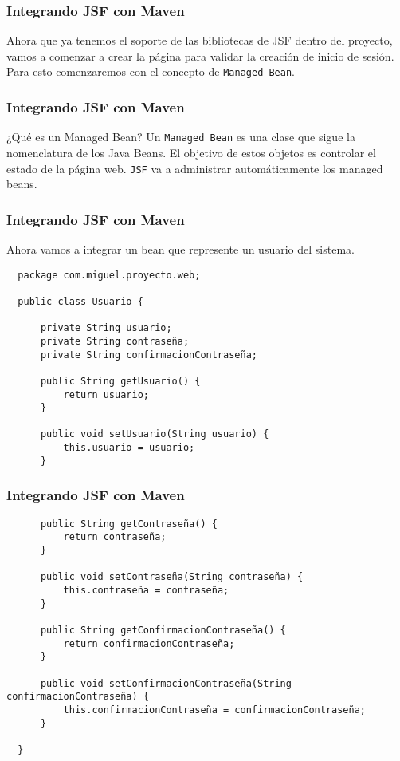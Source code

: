 \documentclass{beamer}
\begin{document}
\begin{frame}[fragile]
  \frametitle{Integrando JSF con Maven}
  Ahora que ya tenemos el soporte de las bibliotecas de JSF dentro del
  proyecto, vamos a comenzar a crear la página para validar la
  creación de inicio de sesión. Para esto comenzaremos con el concepto
  de \texttt{Managed Bean}.
\end{frame}

\begin{frame}[fragile]
  \frametitle{Integrando JSF con Maven}
    \begin{block}{¿Qué es un Managed Bean?}
    Un \texttt{Managed Bean} es una clase que sigue la nomenclatura de
    los Java Beans. El objetivo de estos objetos es controlar el estado de
    la página web. \texttt{JSF} va a administrar automáticamente los
    managed beans.
  \end{block}
\end{frame}

\begin{frame}[fragile]
  \frametitle{Integrando JSF con Maven}
  Ahora vamos a integrar un bean que represente un usuario del
  sistema.

  \begin{verbatim}
  package com.miguel.proyecto.web;

  public class Usuario {

      private String usuario;
      private String contraseña;
      private String confirmacionContraseña;

      public String getUsuario() {
          return usuario;
      }

      public void setUsuario(String usuario) {
          this.usuario = usuario;
      }

  \end{verbatim}
\end{frame}

\begin{frame}[fragile]
  \frametitle{Integrando JSF con Maven}
  \begin{verbatim}
      public String getContraseña() {
          return contraseña;
      }

      public void setContraseña(String contraseña) {
          this.contraseña = contraseña;
      }

      public String getConfirmacionContraseña() {
          return confirmacionContraseña;
      }

      public void setConfirmacionContraseña(String confirmacionContraseña) {
          this.confirmacionContraseña = confirmacionContraseña;
      }

  }
  \end{verbatim}
\end{frame}
\end{document}

